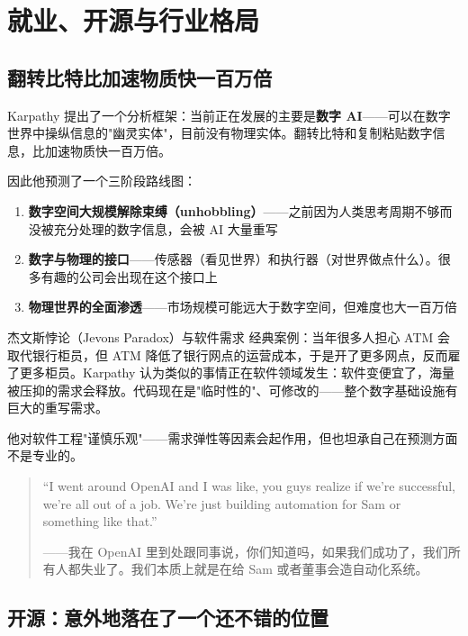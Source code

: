 \section{就业、开源与行业格局}

\subsection{翻转比特比加速物质快一百万倍}

Karpathy 提出了一个分析框架：当前正在发展的主要是\textbf{数字 AI}——可以在数字世界中操纵信息的"幽灵实体"，目前没有物理实体。翻转比特和复制粘贴数字信息，比加速物质快一百万倍。

因此他预测了一个三阶段路线图：
\begin{enumerate}
    \item \textbf{数字空间大规模解除束缚（unhobbling）}——之前因为人类思考周期不够而没被充分处理的数字信息，会被 AI 大量重写
    \item \textbf{数字与物理的接口}——传感器（看见世界）和执行器（对世界做点什么）。很多有趣的公司会出现在这个接口上
    \item \textbf{物理世界的全面渗透}——市场规模可能远大于数字空间，但难度也大一百万倍
\end{enumerate}

\begin{knowledgebox}{杰文斯悖论（Jevons Paradox）与软件需求}
经典案例：当年很多人担心 ATM 会取代银行柜员，但 ATM 降低了银行网点的运营成本，于是开了更多网点，反而雇了更多柜员。Karpathy 认为类似的事情正在软件领域发生：软件变便宜了，海量被压抑的需求会释放。代码现在是"临时性的"、可修改的——整个数字基础设施有巨大的重写需求。
\end{knowledgebox}

他对软件工程"谨慎乐观"——需求弹性等因素会起作用，但也坦承自己在预测方面不是专业的。

\begin{quote}
``I went around OpenAI and I was like, you guys realize if we're successful, we're all out of a job. We're just building automation for Sam or something like that.''

——我在 OpenAI 里到处跟同事说，你们知道吗，如果我们成功了，我们所有人都失业了。我们本质上就是在给 Sam 或者董事会造自动化系统。
\end{quote}

\subsection{开源：意外地落在了一个还不错的位置}


